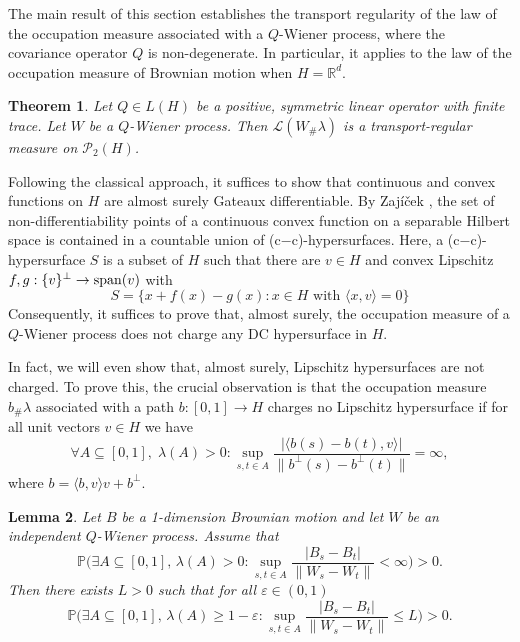 \documentclass[a4paper]{amsart}
\newtheorem{theorem}{Theorem}
\numberwithin{theorem}{section}
\newtheorem{lemma}[theorem]{Lemma}
\theoremstyle{definition}
\newcommand{\law}{\mathcal{L}}
\renewcommand{\epsilon}{\varepsilon}
\renewcommand{\H}{H}
\begin{document}
The main result of this section establishes the transport regularity of the law of the occupation measure associated with a $Q$-Wiener process, where the covariance operator $Q$ is non-degenerate. 
In particular, it applies to the law of the occupation measure of Brownian motion when $\H = \mathbb{R}^d$.
\begin{theorem} \label{thm:Q-Wiener.TR}
    Let $Q \in L(H)$ be a positive, symmetric linear operator with finite trace.
    Let $W$ be a $Q$-Wiener process. 
    Then $\law(W_\# \lambda)$ is a transport-regular measure on $\mathcal P_2(H)$.
\end{theorem}

Following the classical approach, it suffices to show that continuous and convex functions on $H$ are almost surely Gateaux differentiable.
By Zajíček \cite{Za}, the set of non-differentiability points of a continuous convex function on a separable Hilbert space is contained in a countable union of (c$-$c)-hypersurfaces.
Here, a (c$-$c)-hypersurface $S$ is a subset of $H$ such that there are $v \in H$ and convex Lipschitz $f,g : \{ v \}^\perp \to {\rm span}(v)$ with
\[
    S = \{ x + f(x) - g(x) : x \in H \text{ with } \langle x, v \rangle = 0 \}
\]
Consequently, it suffices to prove that, almost surely, the occupation measure of a $Q$-Wiener process does not charge any DC hypersurface in $H$.

In fact, we will even show that, almost surely, Lipschitz hypersurfaces are not charged.
To prove this, the crucial observation is that the occupation measure $b_\# \lambda$ associated with a path $b : [0,1] \to H$ charges no Lipschitz hypersurface if for all unit vectors $v \in H$ we have
\[
    \forall A \subseteq [0,1], \; \lambda(A) > 0 : \sup_{s,t \in A} \frac{|\langle b(s) - b(t), v \rangle|}{\|b^\perp(s) - b^\perp(t)\|} = \infty,
\]
where $b = \langle b, v \rangle v + b^\perp$.

\begin{lemma} \label{lem:non.zero}
    Let $B$ be a 1-dimension Brownian motion and let $W$ be an independent $Q$-Wiener process.
    Assume that
    \begin{equation}
    \label{eq:non.zero}
        \mathbb P\Big( \exists A \subseteq [0,1], \, \lambda(A) > 0 : \sup_{s,t \in A} \frac{|B_s - B_t|}{\|W_s - W_t\|} < \infty \Big) > 0.
    \end{equation}
    Then there exists $L > 0$ such that for all $\epsilon \in (0,1)$
    \[
        \mathbb P\Big( \exists A \subseteq [0,1], \, \lambda(A) \ge 1 - \epsilon : \sup_{s,t \in A} \frac{|B_s - B_t|}{\|W_s - W_t\|} \le L  \Big) > 0.
    \]
\end{lemma}
\end{document}
